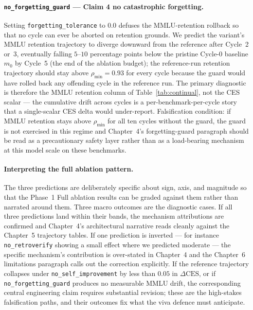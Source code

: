 \paragraph{\texttt{no\_forgetting\_guard} --- Claim 4 no catastrophic forgetting.}
Setting \texttt{forgetting\_tolerance} to $0.0$ defuses the MMLU-retention rollback so that no cycle can ever be aborted on retention grounds. We predict the variant's MMLU retention trajectory to diverge downward from the reference after Cycle~2 or~3, eventually falling $5$--$10$ percentage points below the pristine Cycle-0 baseline $m_{0}$ by Cycle~5 (the end of the ablation budget); the reference-run retention trajectory should stay above $\rho_{\min} = 0.93$ for every cycle because the guard would have rolled back any offending cycle in the reference run. The primary diagnostic is therefore the MMLU retention column of Table~\ref{tab:continual}, not the CES scalar --- the cumulative drift across cycles is a per-benchmark-per-cycle story that a single-scalar CES delta would under-report. Falsification condition: if MMLU retention stays above $\rho_{\min}$ for all ten cycles without the guard, the guard is not exercised in this regime and Chapter~4's forgetting-guard paragraph should be read as a precautionary safety layer rather than as a load-bearing mechanism at this model scale on these benchmarks.

\paragraph{Interpreting the full ablation pattern.}
The three predictions are deliberately specific about sign, axis, and magnitude so that the Phase~1 Full ablation results can be graded against them rather than narrated around them. Three macro outcomes are the diagnostic cases. If all three predictions land within their bands, the mechanism attributions are confirmed and Chapter~4's architectural narrative reads cleanly against the Chapter~5 trajectory tables. If one prediction is inverted --- for instance \texttt{no\_retroverify} showing a small effect where we predicted moderate --- the specific mechanism's contribution is over-stated in Chapter~4 and the Chapter~6 limitations paragraph calls out the correction explicitly. If the reference trajectory collapses under \texttt{no\_self\_improvement} by less than $0.05$ in $\Delta\text{CES}$, or if \texttt{no\_forgetting\_guard} produces no measurable MMLU drift, the corresponding central engineering claim requires substantial revision; these are the high-stakes falsification paths, and their outcomes fix what the viva defence must anticipate.

